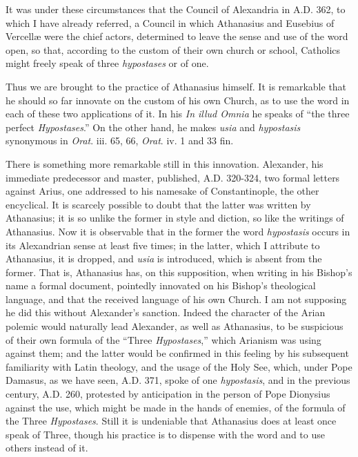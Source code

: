 It was under these circumstances that the Council of Alexandria in A.D.
362, to which I have already referred, a Council in which Athanasius
and Eusebius of Vercellæ were the chief actors, determined to
leave the sense and use of the word open, so that, according to the
custom of their own church or school, Catholics might freely speak of
three \emph{hypostases} or of one.

Thus we are brought to the practice of Athanasius himself. It is
remarkable that he should so far innovate on the custom of his own
Church, as to use the word in each of these two applications of it. In
his \emph{In illud Omnia} he speaks of ``the three perfect \emph{Hypostases}.''
On the other hand, he makes \emph{usia} and \emph{hypostasis}
synonymous in \emph{Orat}. iii. 65, 66, \emph{Orat}. iv. 1 and 33 fin.

There is something more remarkable still in this innovation.
Alexander, his immediate predecessor and master, published, A.D.
320-324, two formal letters against Arius, one addressed to his
namesake of Constantinople, the other encyclical. It is scarcely
possible to doubt that the latter was written by Athanasius; it is so
unlike the former in style and diction, so like the writings of
Athanasius. Now it is observable that in the former the word \emph{hypostasis}
occurs in its Alexandrian sense at least five times; in the latter,
which I attribute to Athanasius, it is dropped, and \emph{usia} is
introduced, which is absent from the former. That is, Athanasius has,
on this supposition, when writing in his Bishop's name a formal
document, pointedly innovated on his Bishop's theological language,
and that the received language of his own Church. I am not supposing
he did this without Alexander's sanction. Indeed the character of the
Arian polemic would naturally lead Alexander, as well as Athanasius,
to be suspicious of their own formula of the ``Three \emph{Hypostases},''
which Arianism was using against them; and the latter would be
confirmed in this feeling by his subsequent familiarity with Latin
theology, and the usage of the Holy See, which, under Pope Damasus, as
we have seen, A.D. 371, spoke of one \emph{hypostasis},
and in the previous century, A.D. 260, protested
by anticipation in the person of Pope Dionysius against the use,
which might be made in the hands of enemies, of the formula of the
Three \emph{Hypostases}. Still it is undeniable that Athanasius does
at least once speak of Three, though his practice is to dispense with
the word and to use others instead of it.

